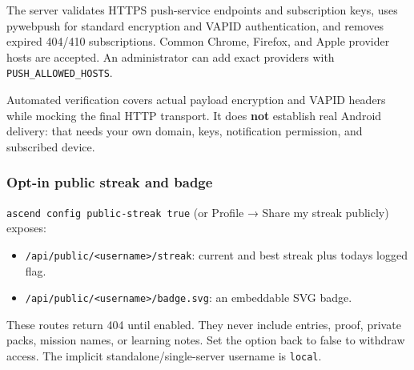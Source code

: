 The server validates HTTPS push-service endpoints and subscription keys,
uses pywebpush for standard encryption and VAPID authentication, and
removes expired 404/410 subscriptions. Common Chrome, Firefox, and Apple
provider hosts are accepted. An administrator can add exact providers
with \texttt{PUSH\_ALLOWED\_HOSTS}.

Automated verification covers actual payload encryption and VAPID
headers while mocking the final HTTP transport. It does \textbf{not}
establish real Android delivery: that needs your own domain, keys,
notification permission, and subscribed device.

\hypertarget{opt-in-public-streak-and-badge}{%
\subsubsection{Opt-in public streak and
badge}\label{opt-in-public-streak-and-badge}}

\texttt{ascend config public-streak true} (or Profile → Share my streak
publicly) exposes:

\begin{itemize}
\tightlist
\item
  \texttt{/api/public/\textless{}username\textgreater{}/streak}: current
  and best streak plus today\textquotesingle s logged flag.
\item
  \texttt{/api/public/\textless{}username\textgreater{}/badge.svg}: an
  embeddable SVG badge.
\end{itemize}

These routes return 404 until enabled. They never include entries,
proof, private packs, mission names, or learning notes. Set the option
back to false to withdraw access. The implicit standalone/single-server
username is \texttt{local}.
